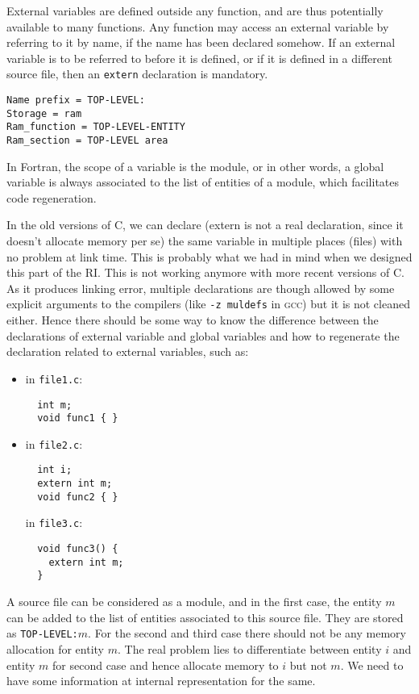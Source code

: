 \documentclass[a4paper]{report}
\begin{document}
\label{external}
External variables are defined outside any function, and are thus
potentially available to many functions. Any function may access an
external variable by referring to it by name, if the name has been
declared somehow. If an external variable is to be referred to before it
is defined, or if it is defined in a different source file, then an
\verb/extern/ declaration is mandatory. 
\begin{verbatim}
Name prefix = TOP-LEVEL:
Storage = ram 
Ram_function = TOP-LEVEL-ENTITY 
Ram_section = TOP-LEVEL area 
\end{verbatim}
In Fortran, the scope of a variable is the module, or in other words, 
a global variable is always associated to the list of entities
of a module, which facilitates code regeneration. 

In the old versions of C, we can declare (extern is not a real declaration, 
since it doesn't allocate memory per se) the same variable in multiple places 
(files) with no problem at link time. This is probably what we had in mind 
when we designed this part of the RI. 
This is not working anymore with more recent versions of C. As it produces 
linking error, multiple declarations are though allowed by some explicit 
arguments to the compilers (like \verb/-z muldefs/ in \textsc{gcc}) but it is not
cleaned either. Hence there should be some way to know the difference between
the declarations of external variable and global variables and how to 
regenerate the declaration related to external variables, such as:
\begin{itemize}
\item in \texttt{file1.c}:
\begin{lstlisting}
  int m;
  void func1 { }
\end{lstlisting}
\item in \texttt{file2.c}:
\begin{lstlisting}
  int i;
  extern int m;
  void func2 { }
\end{lstlisting}
in \texttt{file3.c}:
\begin{lstlisting}
  void func3() {
    extern int m;
  }
\end{lstlisting}
\end{itemize}

A source file can be considered as a module, and in the first case, the
entity $m$ can be added to the list of entities associated to this source
file. They are stored as \verb/TOP-LEVEL:/$m$. For the second and third case 
there should not be any memory allocation for entity $m$. The real problem lies 
to differentiate between entity $i$ and entity $m$ for second case and hence 
allocate memory to $i$ but not $m$. We need to have some information at internal 
representation for the same.
\end{document}
